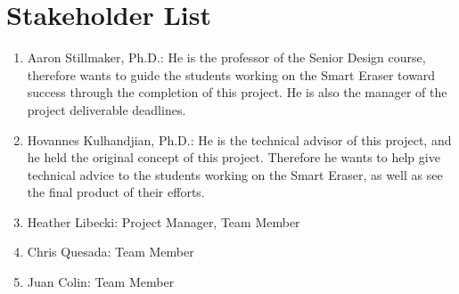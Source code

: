  \section{Stakeholder List}
 \begin{enumerate}
 	\item	Aaron Stillmaker, Ph.D.: He is the professor of the Senior Design course, therefore wants to guide the students working on the Smart Eraser toward success through the completion of this project. He is also the manager of the project deliverable deadlines.\\ 
 	\item   Hovannes Kulhandjian, Ph.D.: He is the technical advisor of this project, and he held the original concept of this project. Therefore he wants to help give technical advice to the students working on the Smart Eraser, as well as see the final product of their efforts.\\
 	\item	Heather Libecki: Project Manager, Team Member\\
 	\item	Chris Quesada: Team Member\\
	\item 	Juan Colin: Team Member\\
 	 	
 \end{enumerate}
 
